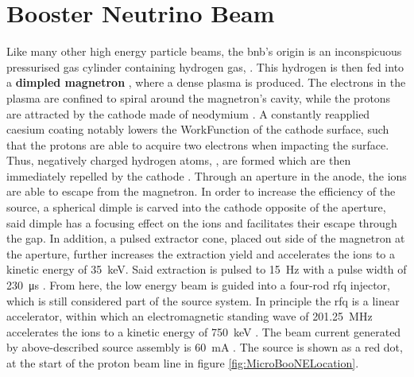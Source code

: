 \section{Booster Neutrino Beam} \label{sec:BNB}
Like many other high energy particle beams, the \gls{bnb}'s origin is an inconspicuous pressurised gas cylinder containing hydrogen gas, . This hydrogen is then fed into a \textbf{dimpled magnetron} \cite{BNBProtonSource1,BNBProtonSource2}, where a dense plasma is produced. The electrons in the plasma are confined to spiral around the magnetron's cavity, while the protons are attracted by the cathode made of neodymium \cite{BNBProtonSource2}. A constantly reapplied caesium coating notably lowers the \gls{WorkFunction} of the cathode surface, such that the protons are able to acquire two electrons when impacting the surface. Thus, negatively charged hydrogen atoms, , are formed which are then immediately repelled by the cathode \cite{BNBProtonSource1}. Through an aperture in the anode, the  ions are able to escape from the magnetron. In order to increase the efficiency of the  source, a spherical dimple is carved into the cathode opposite of the aperture, \ie said dimple has a focusing effect on the ions and facilitates their escape through the gap. In addition, a pulsed extractor cone, placed out side of the magnetron at the aperture, further increases the extraction yield and accelerates the  ions to a kinetic energy of \SI{35}{\kilo\electronvolt}. Said  extraction is pulsed to \SI{15}{\hertz} with a pulse width of \SI{230}{\micro\second} \cite{BNBProtonSource2,BNBProtonSource3}. From here, the low energy beam is guided into a four-rod \gls{rfq} injector, which is still considered part of the  source system. In principle the \gls{rfq} is a linear accelerator, within which an electromagnetic standing wave of \SI{201.25}{\mega\hertz} accelerates the  ions to a kinetic energy of \SI{750}{\kilo\electronvolt} \cite{BNBProtonSource4}. The beam current generated by above-described  source assembly is \SI{60}{\milli\ampere} \cite{BNBProtonSource3}. The  source is shown as a red dot, at the start of the proton beam line in figure \ref{fig:MicroBooNELocation}.


